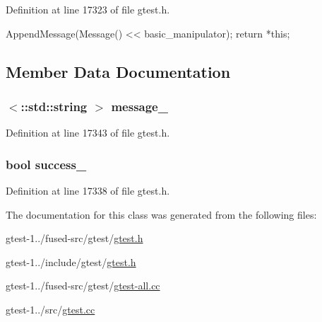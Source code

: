 \-Definition at line 17323 of file gtest.\-h.


\begin{DoxyCode}
                                                            {
    AppendMessage(Message() << basic_manipulator);
    return *this;
  }
\end{DoxyCode}


\subsection{\-Member \-Data \-Documentation}
\hypertarget{classtesting_1_1AssertionResult_a9933c5cd488d58e22fbf84f7c4c96707}{
\subsubsection[{message\-\_\-}]{$<$\-::std\-::string $>$ {\bf message\-\_\-}}}\label{dd/d5f/classtesting_1_1AssertionResult_a9933c5cd488d58e22fbf84f7c4c96707}


\-Definition at line 17343 of file gtest.\-h.

\hypertarget{classtesting_1_1AssertionResult_af269425d62c74663296db74fb636833d}{
\subsubsection[{success\-\_\-}]{\setlength{\rightskip}{0pt plus 5cm}bool {\bf success\-\_\-}}}\label{dd/d5f/classtesting_1_1AssertionResult_af269425d62c74663296db74fb636833d}


\-Definition at line 17338 of file gtest.\-h.



\-The documentation for this class was generated from the following files\-:\begin{DoxyCompactItemize}
\item 
gtest-\/1../fused-\/src/gtest/\hyperlink{fused-src_2gtest_2gtest_8h}{gtest.\-h}\item 
gtest-\/1../include/gtest/\hyperlink{include_2gtest_2gtest_8h}{gtest.\-h}\item 
gtest-\/1../fused-\/src/gtest/\hyperlink{fused-src_2gtest_2gtest-all_8cc}{gtest-\/all.\-cc}\item 
gtest-\/1../src/\hyperlink{gtest_8cc}{gtest.\-cc}\end{DoxyCompactItemize}
